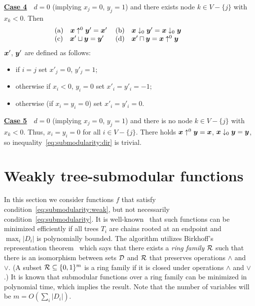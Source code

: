 \documentclass[11pt,onecolumn]{article}
\def\D{{\cal D}}
\def\calR{{\cal R}}
\newcommand{\bx}{\mbox{\boldmath $x$}}
\newcommand{\by}{\mbox{\boldmath $y$}}
\begin{document}
\vspace{3pt}
\noindent \underline{\bf Case 4}~~$d=0$ (implying $x_j=0$, $y_j=1$) and there exists node $k\in V-\{j\}$
with $x_k<0$. Then
\begin{equation}
\begin{tabular}{ll}
(a)$\quad \bx \uparrow^0 \by' =  \bx' $ &
(b)$\quad \bx \downarrow_0 \by' = \bx \downarrow_0 \by \qquad \quad  $ \\
(c)$\quad \bx' \sqcup \by =  \by'$ &
(d)$\quad \bx' \sqcap \by = \bx\uparrow^0 \by $ 
\end{tabular}
\end{equation}
$\bx'$, $\by'$ are defined as follows: 
\begin{itemize}
\item if $i=j$ set $x'_j=0$, $y'_j=1$; 
\item otherwise if $x_i<0$, $y_i=0$ set $x'_i=y'_i=-1$;
\item otherwise (if $x_i=y_i=0$) set $x'_i=y'_i=0$.
\end{itemize}


\vspace{3pt}
\noindent \underline{\bf Case 5}~~$d=0$ (implying $x_j=0$, $y_j=1$) and there is no node $k\in V-\{j\}$ with $x_k<0$. 
Thus, $x_i=y_i=0$ for all $i\in V-\{j\}$. There holds $\bx\uparrow^0\by=\bx$, $\bx\downarrow_0\by=\by$,
so inequality~\eqref{eq:submodularity:dir} is trivial.










\section{Weakly tree-submodular functions}\label{sec:weak}
In this section we consider functions $f$ that satisfy condition~\eqref{eq:submodularity:weak},
but not necessarily condition~\eqref{eq:submodularity}.
It is well-known~\cite{Topkis:78,Murota:book} that such functions can be minimized efficiently 
if all trees $T_i$ are chains rooted at an endpoint and $\max_i |D_i|$ is polynomially bounded.
The algorithm utilizes Birkhoff's representation theorem~\cite{Birkhoff:37} which says that there exists a {\em ring family} $\calR$
such that there is an isomorphism between sets $\D$ and $\calR$ that preserves operations $\wedge$ and $\vee$.
(A subset $\calR\subseteq\{0,1\}^m$ is a ring family if it is closed under operations $\wedge$ and $\vee$.)
It is known that submodular functions over a ring family can be minimized in polynomial time, which implies the result.
Note that the number of variables will be $m=O(\sum_{i}|D_i|)$.
\end{document}
